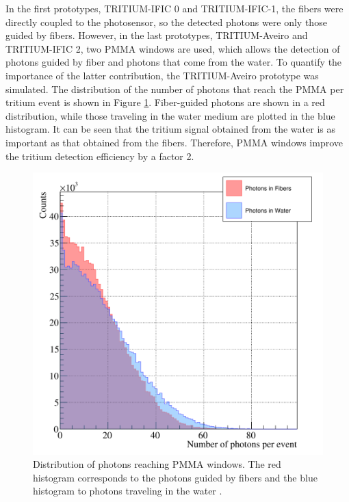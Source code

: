 In the first prototypes, TRITIUM-IFIC 0 and TRITIUM-IFIC-1, the fibers were directly coupled to the photosensor, so the detected photons were only those guided by fibers. However, in the last prototypes, TRITIUM-Aveiro and TRITIUM-IFIC 2, two PMMA windows are used, which allows the detection of photons guided by fiber and photons that come from the water. To quantify the importance of the latter contribution, the TRITIUM-Aveiro prototype was simulated. The distribution of the number of photons that reach the PMMA per tritium event is shown in Figure \ref{fig:PMMAEffect}. Fiber-guided photons are shown in a red distribution, while those traveling in the water medium are plotted in the blue histogram. It can be seen that the tritium signal obtained from the water is as important as that obtained from the fibers. Therefore, PMMA windows improve the tritium detection efficiency by a factor 2.

\begin{figure}[hbtp]
\centering
\includegraphics[scale=0.3]{Figures/8SimulationsResults/81TRITIUMDesign/815PMMA/PhotonsDetectedWaterFiber.png}
\caption{Distribution of photons reaching PMMA windows. The red histogram corresponds to the photons guided by fibers and the blue histogram to photons traveling in the water \cite{SimulationPaperCarlos}.\label{fig:PMMAEffect}}
\end{figure}

